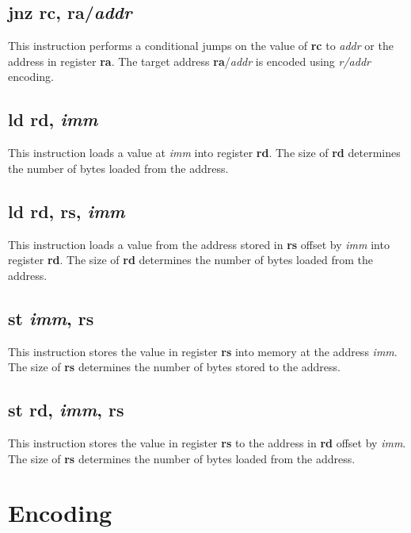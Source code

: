 \documentclass[12pt, a4paper, oneside, final]{article}
\def\i#1{\textcolor{icolour}{\bfseries#1}}
\def\r#1{\textcolor{rcolour}{\bfseries r#1}}
\begin{document}
\subsection{\i{jnz} \r{c}, \r{a}/\textit{addr}}
This instruction performs a conditional jumps on the value of \r{c} to \textit{addr} or the address
in register \r{a}. The target address \r{a}/\textit{addr} is encoded using \textit{r/addr} encoding.

\subsection{\i{ld} \r{d}, \textit{imm}}
This instruction loads a value at \textit{imm} into register \r{d}. The size of \r{d} determines the
number of bytes loaded from the address.

\subsection{\i{ld} \r{d}, \r{s}, \textit{imm}}
This instruction loads a value from the address stored in \r{s} offset by \textit{imm} into register
\r{d}. The size of \r{d} determines the number of bytes loaded from the address.

\subsection{\i{st} \textit{imm}, \r{s}}
This instruction stores the value in register \r{s} into memory at the address \textit{imm}. The
size of \r{s} determines the number of bytes stored to the address.

\subsection{\i{st} \r{d}, \textit{imm}, \r{s}}
This instruction stores the value in register \r{s} to the address in \r{d} offset by \textit{imm}.
The size of \r{s} determines the number of bytes loaded from the address.

\clearpage\section{Encoding}\label{sect:encoding}
\end{document}
